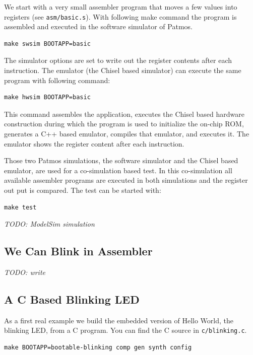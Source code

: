 \documentclass[a4paper,fontsize=10pt,twoside,DIV15,BCOR12mm,headinclude=true,footinclude=false,pagesize,bibtotoc]{scrbook}
\newcommand{\code}[1]{{\texttt{#1}}}
\newcommand{\todo}[1]{{\emph{TODO: #1}}}
\begin{document}
We start with a very small assembler program that moves a few values into registers
(see \code{asm/basic.s}). With following make command the program is assembled
and executed in the software simulator of Patmos.

\begin{verbatim}
make swsim BOOTAPP=basic
\end{verbatim}

The simulator options are set to write out the register contents after each instruction.
The emulator (the Chisel based simulator) can execute the same program
with following command:

\begin{verbatim}
make hwsim BOOTAPP=basic
\end{verbatim}

This command assembles the application, executes the Chisel based hardware
construction during which the program is used to initialize the on-chip ROM,
generates a C++ based emulator, compiles that emulator, and executes it.
The emulator shows the register content after each instruction.

Those two Patmos simulations, the software simulator and the Chisel based emulator,
are used for a co-simulation based test. In this co-simulation all available assembler
programs are executed in both simulations and the register out put is compared.
The test can be started with:

\begin{verbatim}
make test
\end{verbatim}


\todo{ModelSim simulation}

\subsection{We Can Blink in Assembler}

\todo{write}

\subsection{A C Based Blinking LED}

As a first real example we build the embedded version of Hello World, the
blinking LED, from a C program. You can find the C source in \code{c/blinking.c}.

\begin{verbatim}
make BOOTAPP=bootable-blinking comp gen synth config
\end{verbatim}
\end{document}

